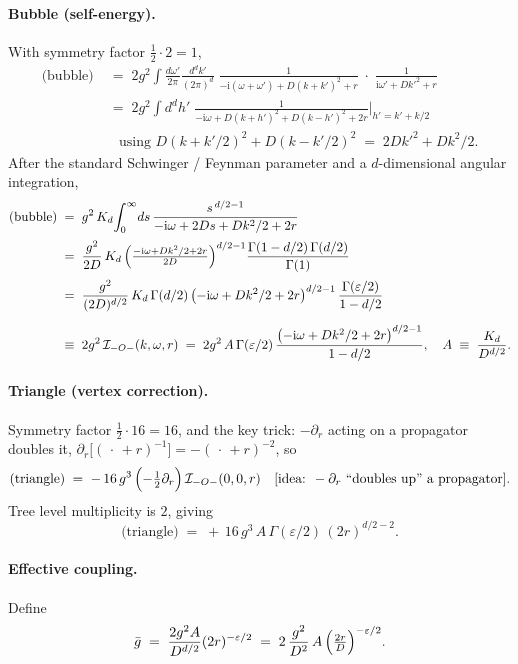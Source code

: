 \documentclass[11pt,a4paper]{article}
\newcommand{\hpink}[1]{\colorbox{gunnarpink}{$#1$}}
\begin{document}
\paragraph{Bubble (self-energy).} With symmetry factor $\tfrac{1}{2}\!\cdot\!2 = 1$,
\begin{align*}
\text{(bubble)}
&\;=\; 2 g^{2}\!\int\! \frac{d\omega'}{2\pi}\frac{d^{d}k'}{(2\pi)^{d}}\;
\frac{1}{-\mathrm i(\omega+\omega') + D(k+k')^{2} + r}\;\cdot\;
\frac{1}{\mathrm i\omega' + D{k'}^{2} + r}\\[2pt]
&\;=\; 2 g^{2}\!\int\! d^{d}h'\;
\frac{1}{-\mathrm i\omega + D(k+h')^{2} + D(k-h')^{2} + 2 r}\bigg|_{h'=k'+k/2}\\[2pt]
&\quad\text{using } D(k{+}k'/2)^{2} + D(k{-}k'/2)^{2} \;=\; 2D{k'}^{2} + Dk^{2}/2.
\end{align*}
After the standard Schwinger / Feynman parameter and a $d$-dimensional angular integration,
\begin{align*}
\text{(bubble)}
&\;=\; g^{2}\,K_{d}\!\int_{0}^{\infty}\! ds\,
\frac{s^{\,d/2-1}}{-\mathrm i\omega + 2Ds + Dk^{2}/2 + 2r}\\[2pt]
&\;=\; \frac{g^{2}}{2D}\,K_{d}\,\Bigl(\tfrac{-\mathrm i\omega + Dk^{2}/2 + 2r}{2D}\Bigr)^{d/2-1}
\frac{\Gamma(1-d/2)\,\Gamma(d/2)}{\Gamma(1)}\\[2pt]
&\;=\; \frac{g^{2}}{(2D)^{d/2}}\,K_{d}\,\Gamma(d/2)\,
\bigl(-\mathrm i\omega + Dk^{2}/2 + 2r\bigr)^{d/2-1}\,\frac{\Gamma(\varepsilon/2)}{1-d/2}\\[6pt]
&\;\equiv\; 2 g^{2}\,\mathcal I_{-O-}(k,\omega,r)
\;=\; 2 g^{2}\, A\,\Gamma(\varepsilon/2)\,
\frac{\bigl(-\mathrm i\omega + Dk^{2}/2 + 2r\bigr)^{d/2-1}}{1-d/2},
\quad A \;\equiv\; \frac{K_{d}}{D^{d/2}}.
\end{align*}

\paragraph{Triangle (vertex correction).} Symmetry factor $\tfrac{1}{2}\cdot 16 = 16$,
and the key trick: $-\partial_{r}$ acting on a propagator doubles it,
\hpink{\partial_{r}\bigl[(\,\cdot\,+r)^{-1}\bigr] = -(\,\cdot\,+r)^{-2}}, so
\[
\text{(triangle)}
\;=\; -\,16\, g^{3}\,\Bigl(-\tfrac{1}{2}\partial_{r}\Bigr)\,\mathcal I_{-O-}(0,0,r)
\quad\text{[idea: } -\partial_{r} \text{ ``doubles up'' a propagator].}
\]
Tree level multiplicity is $2$, giving
\[
\text{(triangle)}
\;=\; +\,16\, g^{3}\, A\,\Gamma(\varepsilon/2)\,(2r)^{d/2-2}.
\]

\paragraph{Effective coupling.} Define
\[
\bar g \;=\; \frac{2g^{2}A}{D^{d/2}}(2r)^{-\varepsilon/2}
\;=\; 2\,\frac{g^{2}}{D^{2}}\, A\,\Bigl(\tfrac{2r}{D}\Bigr)^{-\varepsilon/2}.
\]
\end{document}
